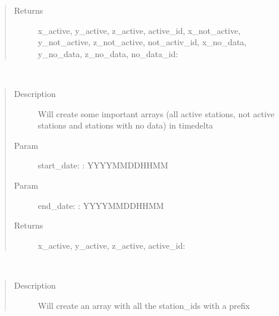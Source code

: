 \documentclass[letterpaper,10pt,english]{sphinxmanual}
\begin{document}
\begin{fulllineitems}
\begin{fulllineitems}
\begin{quote}
\begin{description}
\item[{Returns}] \leavevmode
\sphinxAtStartPar
x\_active, y\_active, z\_active, active\_id, x\_not\_active, y\_not\_active, z\_not\_active, not\_activ\_id, x\_no\_data, y\_no\_data, z\_no\_data, no\_data\_id: 

\end{description}\end{quote}

\end{fulllineitems}


\begin{fulllineitems}
\label{\detokenize{DwdDataPrep:DwdDataPrep.Reader.get_active_stations_in_date}}~\begin{quote}\begin{description}
\item[{Description}] \leavevmode
\sphinxAtStartPar
Will create some important arrays (all active stations, not active stations and stations with no data) in timedelta

\item[{Param}] \leavevmode
\sphinxAtStartPar
start\_date: : YYYYMMDDHHMM

\item[{Param}] \leavevmode
\sphinxAtStartPar
end\_date: : YYYYMMDDHHMM

\item[{Returns}] \leavevmode
\sphinxAtStartPar
x\_active, y\_active, z\_active, active\_id: 

\end{description}\end{quote}

\end{fulllineitems}


\begin{fulllineitems}
\label{\detokenize{DwdDataPrep:DwdDataPrep.Reader.get_station_ids}}~\begin{quote}\begin{description}
\item[{Description}] \leavevmode
\sphinxAtStartPar
Will create an array with all the station\_ids with a prefix


\end{description}
\end{quote}
\end{fulllineitems}
\end{fulllineitems}
\end{document}
